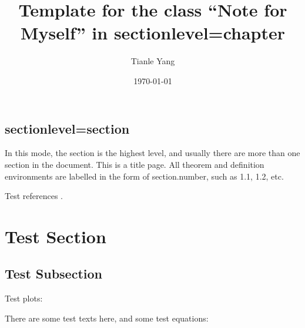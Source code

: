 \documentclass[sectionlevel=chapter]{noteformyself}
\title{Template for the class ``Note for Myself'' in sectionlevel=chapter}
\author{Tianle Yang}
\date{\today}
\begin{document}
    \maketitle

    \tableofcontents %


        \subsection{sectionlevel=section}

        In this mode, the section is the highest level, and usually there are more than one section in the document. 
        This is a title page.
        All theorem and definition environments are labelled in the form of section.number, such as 1.1, 1.2, etc.

        Test references \cite{Har77}.


    \section{Test Section}

        \subsection{Test Subsection}

        Test plots:

        \begin{figure}[htbp]
            \begin{center}
                
            \end{center}
        \end{figure}

        There are some test texts here, and some test equations:

    \printbibliography[heading=bibintoc, title={References}] %
\end{document}

